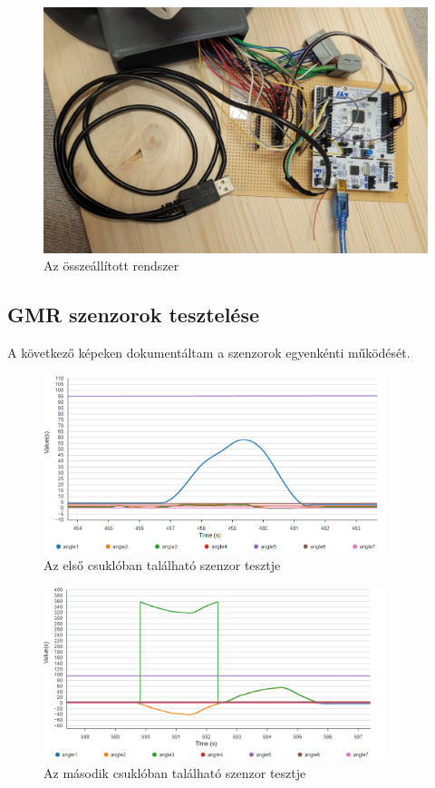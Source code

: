 \begin{figure}[!ht]
\centering
\includegraphics[width=120mm, keepaspectratio]{figures/Csuklo_szog_teszt/mikrovez_2}
\caption{Az összeállított rendszer}
\label{fig:szummarendszer}
\end{figure}


\newpage
\subsection{GMR szenzorok tesztelése}

A következő képeken dokumentáltam a szenzorok egyenkénti működését.

\begin{figure}[!ht]
\centering
\includegraphics[width=100mm, keepaspectratio]{figures/Csuklo_szog_teszt/1}
\caption{Az első csuklóban található szenzor tesztje}
\label{fig:csuklo_teszt_1}
\end{figure}

\begin{figure}[!ht]
\centering
\includegraphics[width=100mm, keepaspectratio]{figures/Csuklo_szog_teszt/2_3}
\caption{Az második csuklóban található szenzor tesztje}
\label{fig:csuklo_teszt_2_3}
\end{figure}


